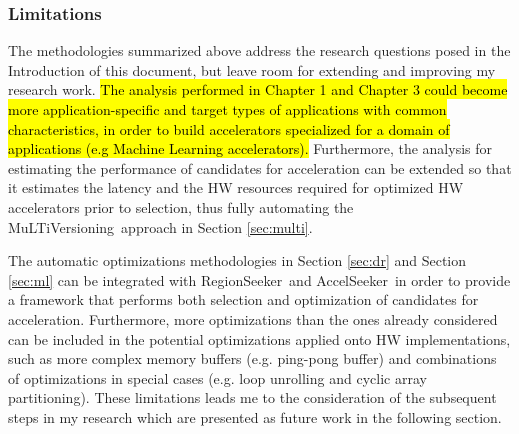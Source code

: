 \documentclass[]{usiinfthesis}
\newcommand{\aseeker}{{AccelSeeker}}
\newcommand{\rseeker}{{RegionSeeker}}
\newcommand{\multi}{MuLTiVersioning}
\begin{document}
\subsubsection{Limitations}

The methodologies summarized above address the research questions posed in the Introduction of this
document, but leave room for extending and improving my research work. 
\hl{
The analysis performed in Chapter 1 and Chapter 3 could become more application-specific and target 
types of applications with common characteristics, in order to build accelerators specialized for a 
domain of applications (e.g Machine Learning accelerators).
}
Furthermore, the analysis for estimating the performance of candidates for acceleration can be extended
so that it estimates the latency and the HW resources required for optimized HW accelerators prior to 
selection, thus fully automating the \multi\ approach in Section \ref{sec:multi}.

The automatic optimizations methodologies in Section \ref{sec:dr} and Section \ref{sec:ml} can be 
integrated with \rseeker\ and \aseeker\ in order to provide a framework that performs both selection and
optimization of candidates for acceleration. Furthermore, more optimizations than the ones already considered
can be included in the potential optimizations applied onto HW implementations, such as more complex
memory buffers (e.g. ping-pong buffer) and combinations of optimizations in special cases (e.g. loop 
unrolling and cyclic array partitioning).
These limitations leads me to the consideration of the subsequent steps in my research which are presented as
future work in the following section.
\end{document}
